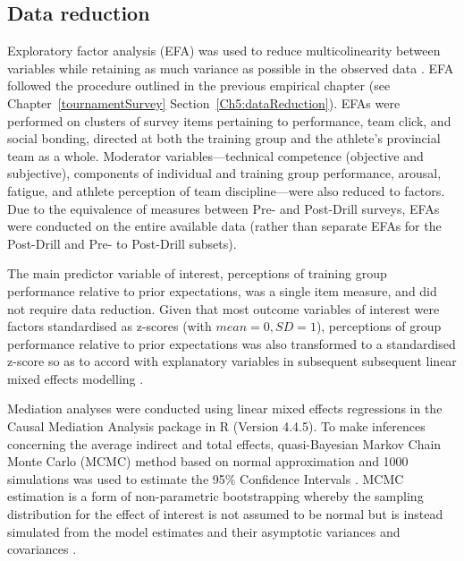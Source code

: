 \subsection{Data reduction}
Exploratory factor analysis (EFA) was used to reduce multicolinearity between variables while retaining as much variance as possible in the observed data \citep[, see Appendix~\ref{app5:EFA}]{Yong2013}. EFA followed the procedure outlined in the previous empirical chapter (see Chapter~\ref{tournamentSurvey} Section~\ref{Ch5:dataReduction}).
EFAs were performed on clusters of survey items pertaining to performance, team click, and social bonding, directed at both the training group and the athlete's provincial team as a whole.  Moderator variables---technical competence (objective and subjective), components of individual and training group performance, arousal, fatigue, and athlete perception of team discipline---were also reduced to factors. Due to the equivalence of measures between Pre- and Post-Drill surveys, EFAs were conducted on the entire available data (rather than separate EFAs for the Post-Drill and Pre- to Post-Drill subsets).




The main predictor variable of interest, perceptions of training group performance relative to prior expectations, was a single item measure, and did not require data reduction.  Given that most outcome variables of interest were factors standardised as z-scores (with $mean = 0, SD = 1$), perceptions of group performance relative to prior expectations was also transformed to a standardised z-score so as to accord with explanatory variables in subsequent subsequent linear mixed effects modelling \citep[for an explanation, see, for example, ][1058]{Beckmann2003}.



Mediation analyses were conducted using linear mixed effects regressions in the Causal Mediation Analysis package in R (Version 4.4.5).  To make inferences concerning the average indirect and total effects, quasi-Bayesian Markov Chain Monte Carlo (MCMC) method based on normal approximation and 1000 simulations was used to estimate the 95\% Confidence Intervals \citep{Tofighi2016a,Imai2010}. MCMC estimation is a form of non-parametric bootstrapping whereby the sampling distribution for the effect of interest is not assumed to be normal but is instead simulated from the model estimates and their asymptotic variances and covariances \cite{Preacher2008}.

